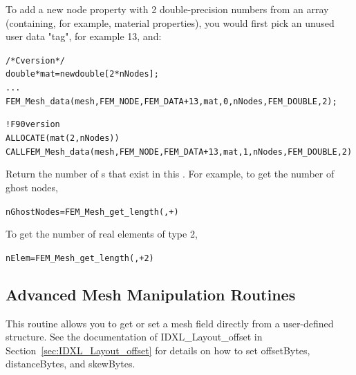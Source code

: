 To add a new node property with 2 double-precision numbers 
from an array  (containing, for example,
material properties), you would first pick an unused
user data "tag", for example 13, and:

  \begin{alltt}
/* C version */
   double *mat=new double[2*nNodes];
   ...
   FEM\_Mesh\_data(mesh,FEM\_NODE, FEM\_DATA+13, mat, 0,nNodes, FEM\_DOUBLE, 2);
   
! F90 version
   ALLOCATE(mat(2,nNodes))
   CALL FEM\_Mesh\_data(mesh,FEM\_NODE,FEM\_DATA+13, mat, 1,nNodes, FEM\_DOUBLE, 2)
  \end{alltt}


Return the number of s that exist in this .
For example, to get the number of ghost nodes, 
  \begin{alltt}
  	nGhostNodes=FEM\_Mesh\_get\_length(,+)
  \end{alltt}
To get the number of real elements of type 2,
  \begin{alltt}
  	nElem=FEM\_Mesh\_get\_length(,+2)
  \end{alltt}


\subsection{Advanced Mesh Manipulation Routines}


This routine allows you to get or set a mesh field directly
from a user-defined structure.  See the documentation of
IDXL\_Layout\_offset in Section~\ref{sec:IDXL_Layout_offset}
for details on how to set offsetBytes, distanceBytes, and skewBytes.


